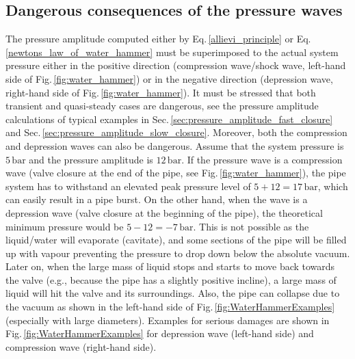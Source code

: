 \subsection{Dangerous consequences of the pressure waves}
The pressure amplitude computed either by Eq.\,\eqref{allievi_principle} or Eq.\,\eqref{newtons_law_of_water_hammer} must be superimposed to the actual system pressure either in the positive direction (compression wave/shock wave, left-hand side of Fig.\,\ref{fig:water_hammer}) or in the negative direction (depression wave, right-hand side of Fig.\,\ref{fig:water_hammer}). It must be stressed that both transient and quasi-steady cases are dangerous, see the pressure amplitude calculations of typical examples in Sec.\,\ref{sec:pressure_amplitude_fast_closure} and Sec.\,\ref{sec:pressure_amplitude_slow_closure}. Moreover, both the compression and depression waves can also be dangerous. Assume that the system pressure is $5\,\mathrm{bar}$ and the pressure amplitude is $12\,\mathrm{bar}$. If the pressure wave is a compression wave (valve closure at the end of the pipe, see Fig.\,\ref{fig:water_hammer}), the pipe system has to withstand an elevated peak pressure level of $5+12=17\,\mathrm{bar}$, which can easily result in a pipe burst. On the other hand, when the wave is a depression wave (valve closure at the beginning of the pipe), the theoretical minimum pressure would be $5-12=-7\,\mathrm{bar}$. This is not possible as the liquid/water will evaporate (cavitate), and some sections of the pipe will be filled up with vapour preventing the pressure to drop down below the absolute vacuum. Later on, when the large mass of liquid stops and starts to move back towards the valve (e.g., because the pipe has a slightly positive incline), a large mass of liquid will hit the valve and its surroundings. Also, the pipe can collapse due to the vacuum as shown in the left-hand side of Fig.\,\ref{fig:WaterHammerExamples} (especially with large diameters). Examples for serious damages are shown in Fig.\,\ref{fig:WaterHammerExamples} for depression wave (left-hand side) and compression wave (right-hand side).

